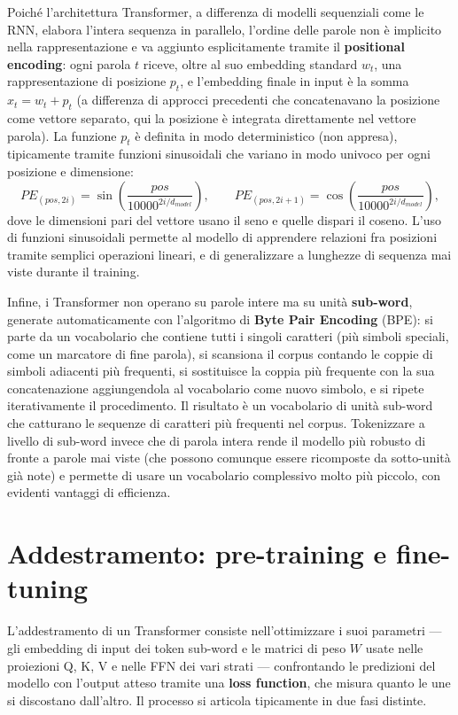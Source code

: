 \documentclass[11pt,a4paper]{report}
\begin{document}
Poiché l'architettura Transformer, a differenza di modelli sequenziali come le RNN, elabora l'intera sequenza in parallelo, l'ordine delle parole non è implicito nella rappresentazione e va aggiunto esplicitamente tramite il \textbf{positional encoding}: ogni parola $t$ riceve, oltre al suo embedding standard $w_t$, una rappresentazione di posizione $p_t$, e l'embedding finale in input è la somma $x_t = w_t + p_t$ (a differenza di approcci precedenti che concatenavano la posizione come vettore separato, qui la posizione è integrata direttamente nel vettore parola). La funzione $p_t$ è definita in modo deterministico (non appresa), tipicamente tramite funzioni sinusoidali che variano in modo univoco per ogni posizione e dimensione:
\[
PE_{(pos,2i)} = \sin\!\left(\frac{pos}{10000^{2i/d_{model}}}\right), \qquad PE_{(pos,2i+1)} = \cos\!\left(\frac{pos}{10000^{2i/d_{model}}}\right),
\]
dove le dimensioni pari del vettore usano il seno e quelle dispari il coseno. L'uso di funzioni sinusoidali permette al modello di apprendere relazioni fra posizioni tramite semplici operazioni lineari, e di generalizzare a lunghezze di sequenza mai viste durante il training.

Infine, i Transformer non operano su parole intere ma su unità \textbf{sub-word}, generate automaticamente con l'algoritmo di \textbf{Byte Pair Encoding} (BPE): si parte da un vocabolario che contiene tutti i singoli caratteri (più simboli speciali, come un marcatore di fine parola), si scansiona il corpus contando le coppie di simboli adiacenti più frequenti, si sostituisce la coppia più frequente con la sua concatenazione aggiungendola al vocabolario come nuovo simbolo, e si ripete iterativamente il procedimento. Il risultato è un vocabolario di unità sub-word che catturano le sequenze di caratteri più frequenti nel corpus. Tokenizzare a livello di sub-word invece che di parola intera rende il modello più robusto di fronte a parole mai viste (che possono comunque essere ricomposte da sotto-unità già note) e permette di usare un vocabolario complessivo molto più piccolo, con evidenti vantaggi di efficienza.

\section{Addestramento: pre-training e fine-tuning}

L'addestramento di un Transformer consiste nell'ottimizzare i suoi parametri --- gli embedding di input dei token sub-word e le matrici di peso $W$ usate nelle proiezioni Q, K, V e nelle FFN dei vari strati --- confrontando le predizioni del modello con l'output atteso tramite una \textbf{loss function}, che misura quanto le une si discostano dall'altro. Il processo si articola tipicamente in due fasi distinte.
\end{document}
